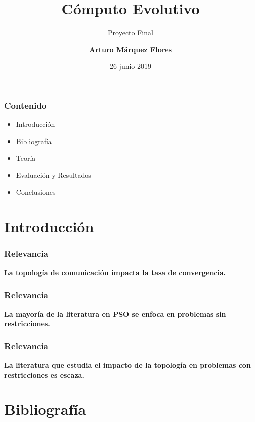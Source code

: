 \documentclass[10pt, compress]{beamer}
\title{Cómputo Evolutivo}
\subtitle{Proyecto Final}
\date{26 junio 2019}
\author{\textbf{Arturo Márquez Flores}}
\institute{
\url{https://github.com/arturomf94/PSO}}
\begin{document}
\maketitle

\begin{frame}[fragile]
  \frametitle{Contenido}
  
  \begin{itemize}
      \item Introducción \\
      \item Bibliografía\\
      \item Teoría\\
      \item Evaluación y Resultados\\ 
      \item Conclusiones
  \end{itemize}

\end{frame}

\section{Introducción}

\begin{frame}[fragile]
  \frametitle{Relevancia}
    \begin{center}
        \textbf{La topología de comunicación impacta la tasa de convergencia.} 
    \end{center}{}
\end{frame}

\begin{frame}[fragile]
  \frametitle{Relevancia}
    \begin{center}
        \textbf{La mayoría de la literatura en PSO se enfoca en problemas sin restricciones.} 
    \end{center}{}
\end{frame}

\begin{frame}[fragile]
  \frametitle{Relevancia}
    \begin{center}
        \textbf{La literatura que estudia el impacto de la topología en problemas con restricciones es escaza.} 
    \end{center}{}
\end{frame}


\section{Bibliografía}
\end{document}
